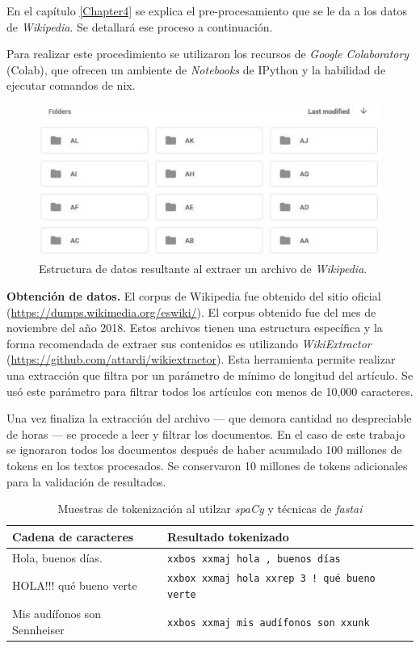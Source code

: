 En el capítulo \ref{Chapter4} se explica el pre-procesamiento que se le da a los datos de \textit{Wikipedia}. Se detallará ese proceso a continuación.

Para realizar este procedimiento se utilizaron los recursos de \emph{Google Colaboratory} (Colab), que ofrecen un ambiente de \textit{Notebooks} de IPython y la habilidad de ejecutar comandos de \*nix.

\begin{figure}
\centering
\includegraphics[scale=0.7]{Figures/wikidump.pdf}
\caption{Estructura de datos resultante al extraer un archivo de \textit{Wikipedia}.}
\label{fig:wikidump}
\end{figure}


\textbf{Obtención de datos.} El corpus de Wikipedia fue obtenido del sitio oficial (\url{https://dumps.wikimedia.org/eswiki/}). El corpus obtenido fue del mes de noviembre del año 2018. Estos archivos tienen una estructura específica y la forma recomendada de extraer sus contenidos es utilizando \emph{WikiExtractor} (\url{https://github.com/attardi/wikiextractor}). Esta herramienta permite realizar una extracción que filtra por un parámetro de mínimo de longitud del artículo. Se usó este parámetro para filtrar todos los artículos con menos de 10,000 caracteres.

Una vez finaliza la extracción del archivo --- que demora cantidad no despreciable de horas --- se procede a leer y filtrar los documentos. En el caso de este trabajo se ignoraron todos los documentos después de haber acumulado 100 millones de tokens en los textos procesados. Se conservaron 10 millones de tokens adicionales para la validación de resultados.

\begin{table}
\begin{tabular}{| l | l |}

\hline
\textbf{Cadena de caracteres} & \textbf{Resultado tokenizado} \\
\hline
Hola, buenos días. & \texttt{xxbos xxmaj hola , buenos días} \\
HOLA!!! qué bueno verte & \texttt{xxbox xxmaj hola xxrep 3 ! qué bueno verte} \\
Mis audífonos son Sennheiser & \texttt{xxbos xxmaj mis audífonos son xxunk} \\
\hline

\end{tabular}
\caption{Muestras de tokenización al utilzar \textit{spaCy} y técnicas de \textit{fastai}}
\label{tab:tokens}
\end{table}

